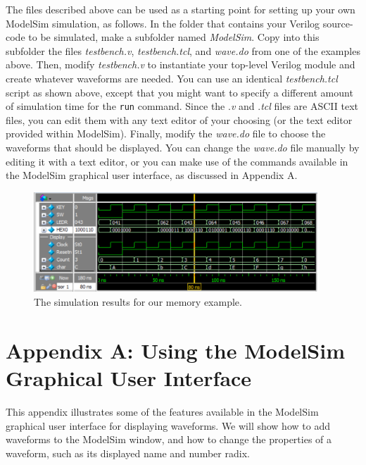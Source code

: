 \documentclass[11pt, twoside, pdftex]{article}
\begin{document}
The files described above can be used as a starting point for setting up your own ModelSim 
simulation, as follows. In the folder that contains your Verilog source-code to be
simulated, make a subfolder named {\it ModelSim}. Copy into this subfolder the 
files {\it testbench.v}, {\it testbench.tcl}, and {\it wave.do} from one of the examples 
above. Then, modify {\it testbench.v} to instantiate your top-level Verilog module and create 
whatever waveforms are needed. You can use an identical {\it testbench.tcl} script as 
shown above, except that you might want to specify a different amount of simulation time for 
the \texttt{run} command. Since the .{\it v} and .{\it tcl} files are ASCII text
files, you can edit them with any text editor of your choosing (or the text editor
provided within ModelSim). Finally, modify the {\it wave.do} file to choose the waveforms 
that should be displayed. You can change the {\it wave.do} file manually by editing it with 
a text editor, or you can make use of the commands available in the ModelSim graphical 
user interface, as discussed in Appendix A.

\begin{figure}[h!]
	\begin{center}
		\includegraphics[width = 0.95\textwidth]{figures/display.png}
	\end{center}
		  \caption{The simulation results for our memory example.}
	\label{fig:gui4}
\end{figure}

\clearpage
\section*{Appendix A: Using the ModelSim Graphical User Interface}

This appendix illustrates some of the features available in the ModelSim graphical user
interface for displaying waveforms. We will show how to add waveforms to the ModelSim
window, and how to change the properties of a waveform, such as its displayed name 
and number radix.
\end{document}
